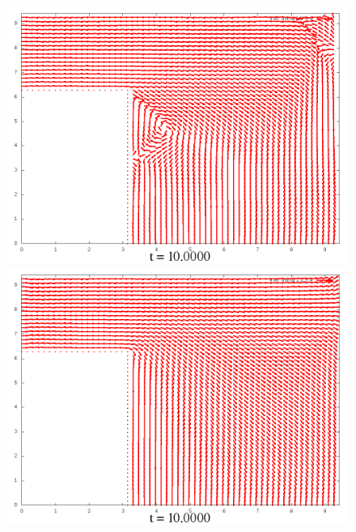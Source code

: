 \documentclass[a4paper, 12pt]{article}
\begin{document}
\begin{figure}[h]
	\begin{minipage}[h]{0.4\linewidth}
		\includegraphics[width=1\linewidth]{./img/01_1_1/V/50}
	\end{minipage}
	\hfill
	\begin{minipage}[h]{0.4\linewidth}
		\includegraphics[width=1\linewidth]{./img/01_1_01/V/50}
	\end{minipage}
\end{figure}
\end{document}
